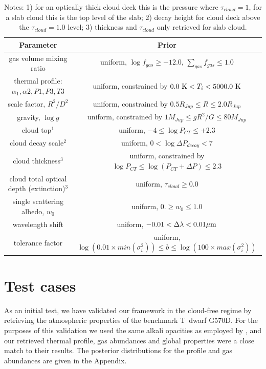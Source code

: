 \documentclass[useAMS,usenatbib]{mn2e}
\begin{document}
\begin{table}
\begin{tabular}{c  c}
\hline
Parameter & Prior \\
\hline
gas volume mixing ratio & uniform, $\log f_{gas} \geq -12.0$, $\sum_{gas}{f_{gas}} \leq 1.0$ \\
thermal profile:  $\alpha_{1}, \alpha{2}, P1, P3, T3$ & uniform, constrained by $0.0~{\rm K} < T_{i} < 5000.0~{\rm K}$ \\
scale factor, $R^{2} / D^{2}$ & uniform, constrained by $0.5 R_{Jup} \leq R \leq 2.0 R_{Jup}$ \\
gravity, $\log g$ & uniform, constrained by $1M_{Jup}  \leq gR^{2} / G \leq 80M_{Jup}$\\ 
cloud top$^{1}$ & uniform, $-4 \leq \log P_{CT}  \leq +2.3$ \\
cloud decay scale$^{2}$ & uniform, $0 < \log \Delta P_{decay} < 7$ \\
cloud thickness$^{3}$ & uniform, constrained by $\log P_{CT} \leq \log (P_{CT} + \Delta P) \leq 2.3$\\
cloud total optical depth (extinction)$^{3}$ & uniform, $\tau_{cloud} \geq 0.0$ \\
single scattering albedo, $w_{0}$ & uniform, $0. \geq w_{0} \leq 1.0$\\ 
wavelength shift & uniform, $-0.01< \Delta \lambda < 0.01 \hbox{$\mu$m}$ \\
tolerance factor & uniform, $\log (0.01 \times min(\sigma_{i}^{2})) \leq b \leq \log(100 \times max(\sigma_{i}^{2}))$ \\
\hline
\end{tabular}
\caption{Notes: 1) for an optically thick cloud deck this is the pressure where $\tau_{cloud} = 1$, for a slab cloud this is the top level of the slab; 2) decay height for cloud deck above the $\tau_{cloud} = 1.0$ level; 3) thickness and $\tau_{cloud}$ only retrieved for slab cloud.   \label{tab:priors} }
\end{table}



\section{Test cases}
\label{sec:fakedata}
As an initial test, we have validated our framework in the cloud-free regime by retrieving the atmospheric properties of the benchmark T~dwarf G570D. For the purposes of this validation we used the same alkali opacities as employed by \citet{line2015}, and our retrieved thermal profile, gas abundances and global properties were a close match to their results. The posterior distributions for the profile and gas abundances are given in the Appendix. 
\end{document}
